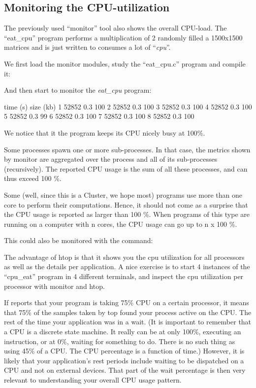 \subsection{Monitoring the CPU-utilization}

The previously used ``monitor'' tool also shows the overall CPU-load. The
``eat\_cpu'' program performs a multiplication of 2 randomly filled a 1500x1500
matrices and is just written to consumes a lot of ``\emph{cpu}''.

We first load the monitor modules, study the ``eat\_cpu.c'' program and compile it:
\begin{prompt}
\end{prompt}

And then start to monitor the \emph{eat\_cpu} program:
\begin{prompt}
time  (s) size (kb) %
1  52852  0.3 100
2  52852  0.3 100
3  52852  0.3 100
4  52852  0.3 100
5  52852  0.3  99
6  52852  0.3 100
7  52852  0.3 100
8  52852  0.3 100
\end{prompt}

We notice that it the program keeps its CPU nicely busy at 100\%.

Some processes spawn one or more sub-processes. In that case, the metrics shown
by monitor are aggregated over the process and all of its sub-processes
(recursively). The reported CPU usage is the sum of all these processes, and
can thus exceed 100 \%.

Some (well, since this is a \hpc Cluster, we hope most) programs use more
than one core to perform their computations. Hence, it should not come as a
surprise that the CPU usage is reported as larger than 100 \%. When programs of
this type are running on a computer with n cores, the CPU usage can go up to n
x 100 \%.

This could also be monitored with the  command:
\begin{prompt}
\end{prompt}

The advantage of htop is that it shows you the cpu utilization for all
processors as well as the details per application.  A nice exercise is to start
4 instances of the ``cpu\_eat'' program in 4 different terminals, and inspect
the cpu utilization per processor with monitor and htop.

If  reports that your program is taking 75\% CPU on a
certain processor, it means that 75\% of the samples taken by top found your
process active on the CPU. The rest of the time your application was in a wait.
(It is important to remember that a CPU is a discrete state machine. It really
can be at only 100\%, executing an instruction, or at 0\%, waiting for
something to do. There is no such thing as using 45\% of a CPU. The CPU
percentage is a function of time.) However, it is likely that your
application's rest periods include waiting to be dispatched on a CPU and not on
external devices. That part of the wait percentage is then very relevant to
understanding your overall CPU usage pattern.

